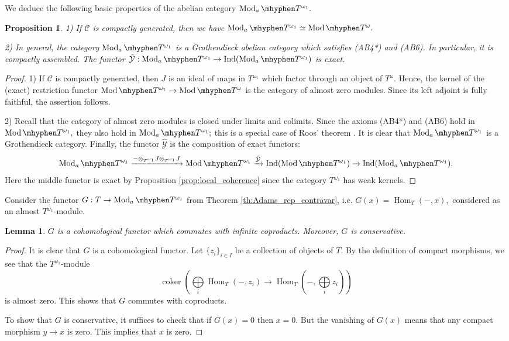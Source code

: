 \documentclass[11pt,leqno]{amsart}
\newtheorem{lemma}[theo]{Lemma}
\newtheorem{prop}[theo]{Proposition}
\numberwithin{equation}{section}
\def\Hom{\operatorname{Hom}}
\newcommand{\tens}[1]{%
  \mathbin{\mathop{\otimes}\displaylimits_{#1}}%
}
\newcommand{\hy}{\mhyphen}
\newcommand{\biggplus}[1][]{\mathop{\bigoplus}\limits_{#1}}
\newcommand{\xto}{\xrightarrow}
\newcommand{\cC}{{\mathcal C}}
\newcommand{\cY}{{\mathcal Y}}
\newcommand{\coker}{\operatorname{coker}}
\newcommand{\Ind}{\operatorname{Ind}}
\newcommand{\Mod}{\operatorname{Mod}}
\begin{document}
We deduce the following basic properties of the abelian category $\Mod_a\hy T^{\omega_1}.$

\begin{prop}\label{prop:almost_modules_T^omega_1_basics} 1) If $\cC$ is compactly generated, then we have $\Mod_a\hy T^{\omega_1}\simeq \Mod\hy T^{\omega}.$

2) In general, the category $\Mod_a\hy T^{\omega_1}$ is a Grothendieck abelian category which satisfies (AB4*) and (AB6). In particular, it is compactly assembled. The functor $\hat{\cY}:\Mod_a\hy T^{\omega_1}\to \Ind(\Mod_a\hy T^{\omega_1})$ is exact.\end{prop}

\begin{proof}1) If $\cC$ is compactly generated, then $J$ is an ideal of maps in $T^{\omega_1}$ which factor through an object of $T^{\omega}.$ Hence, the kernel of the (exact) restriction functor $\Mod\hy T^{\omega_1}\to \Mod\hy T^{\omega}$ is the category of almost zero modules. Since its left adjoint is fully faithful, the assertion follows.

2) Recall that the category of almost zero modules is closed under limits and colimits. Since the axioms (AB4*) and (AB6) hold in $\Mod\hy T^{\omega_1},$ they also hold in $\Mod_a\hy T^{\omega_1};$ this is a special case of Roos' theorem \cite{Roo65}. It is clear that $\Mod_a\hy T^{\omega_1}$ is a Grothendieck category. Finally, the functor $\hat{\cY}$ is the composition of exact functors:
$$\Mod_a\hy T^{\omega_1}\xto{-\tens{T^{\omega_1}}J\tens{T^{\omega_1}}J}\Mod\hy T^{\omega_1}\xto{\hat{\cY}}\Ind(\Mod\hy T^{\omega_1})\to \Ind(\Mod_a\hy T^{\omega_1}).$$ Here the middle functor is exact by Proposition \ref{prop:local_coherence} since the category $T^{\omega_1}$ has weak kernels.
\end{proof}

Consider the functor $G:T\to\Mod_a\hy T^{\omega_1}$ from Theorem \ref{th:Adams_rep_contravar}, i.e. $G(x)=\Hom_T(-,x),$ considered as an almost $T^{\omega_1}$-module. 

\begin{lemma}\label{lem:G_cohom_functor} $G$ is a cohomological functor which commutes with infinite coproducts. Moreover, $G$ is conservative.\end{lemma}

\begin{proof}It is clear that $G$ is a cohomological functor. Let $\{z_i\}_{i\in I}$ be a collection of objects of $T.$ By the definition of compact morphisms, we see that the $T^{\omega_1}$-module
$$\coker(\biggplus[i]\Hom_T(-,z_i)\to \Hom_T(-,\biggplus[i] z_i))$$ is almost zero. This shows that $G$ commutes with coproducts.

To show that $G$ is conservative, it suffices to check that if $G(x)=0$ then $x=0.$ But the vanishing of $G(x)$ means that any compact morphism $y\to x$ is zero. This implies that $x$ is zero.\end{proof}
\end{document}
